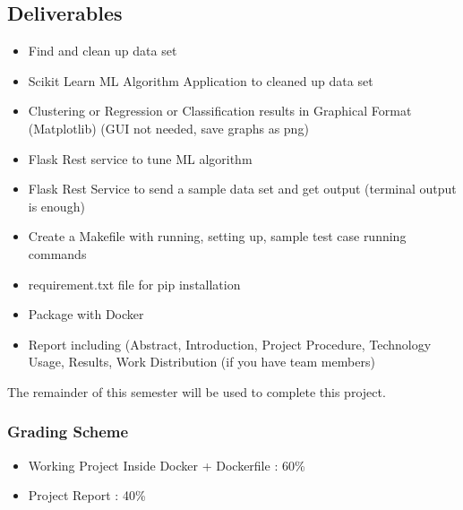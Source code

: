 \begin{comment}
Then we need to show these data to the user in form of tabular or
chart representation. For this purpose you should use Python Pandas
and Matplotlib.  Now you have completed 80 percent of your
project. Then you must give a functionality to users. Now you need to
feed these data to the Linear Regression algorithm and get results and
then use matplotlib to show the regression curve. User submits a datapoint
in form of the original data format.

\begin{lstlisting}
User Input: Private, 205019, Assoc-acdm, 12, Never-married, Sales, Not-in-family, Black, Male, 0, 0, 50, United-States, <=50K
Expected Output : 12
Predicted Output : 12.5
\end{lstlisting}

This way you can compare the accuracy of your training model.
\end{comment}

\subsection{Deliverables}

\begin{itemize}
\item Find and clean up data set 
\item Scikit Learn ML Algorithm Application to cleaned up data set
\item Clustering or Regression or Classification results in Graphical
  Format (Matplotlib) (GUI not needed, save graphs as png)
\item Flask Rest service to tune ML algorithm
\item Flask  Rest Service  to send  a sample data  set and  get output
  (terminal output is enough)
\item Create a Makefile with running, setting up, sample test case
  running commands
\item requirement.txt file for pip installation
\item Package with Docker
\item Report including (Abstract, Introduction, Project
  Procedure, Technology Usage, Results, Work Distribution (if you have
  team members)
\end{itemize}

The remainder of this semester will be used to complete this
project. 

\subsubsection{Grading Scheme}

\begin{itemize}
\item Working Project Inside Docker + Dockerfile : 60\%
\item Project Report : 40\%
\end{itemize}


